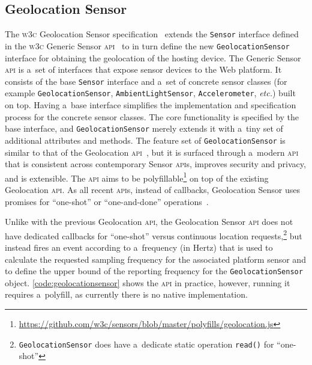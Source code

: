 \documentclass[sigconf,hyphens]{acmart}
\begin{document}
\subsection{Geolocation Sensor}

The \textsc{w3c} Geolocation Sensor specification~\cite{kostiainen2018geolocation}
extends the \texttt{Sensor} interface defined in the
\textsc{w3c} Generic Sensor \textsc{api}~\cite{waldron2018genericsensor}
to in turn define the new \texttt{GeolocationSensor} interface
for obtaining the geolocation of the hosting device.
The Generic Sensor \textsc{api} is a~set of interfaces that expose sensor devices to the Web
platform. It consists of the base \texttt{Sensor} interface and a~set of concrete sensor classes
(for example \texttt{GeolocationSensor}, \texttt{AmbientLightSensor}, \texttt{Accelerometer},
\textit{etc.}) built on top.
Having a~base interface simplifies the implementation and specification process for the concrete
sensor classes. The core functionality is specified by the base interface, and
\texttt{GeolocationSensor} merely extends it with a~tiny set of additional attributes and methods.
The feature set of \texttt{GeolocationSensor} is similar
to that of the Geolocation \textsc{api}~\cite{raskin2010geolocation},
but it is surfaced through a~modern \textsc{api} that is consistent across contemporary Sensor
\textsc{api}s, improves security and privacy, and is extensible.
The \textsc{api} aims to be
polyfillable\footnote{\url{https://github.com/w3c/sensors/blob/master/polyfills/geolocation.js}}
on top of the existing Geolocation \textsc{api}.
As all recent \textsc{api}s, instead of callbacks, Geolocation Sensor
uses promises for ``one-shot'' or ``one-and-done''
operations~\cite{denicola2018tag}.

Unlike with the previous Geolocation \textsc{api}, the Geolocation Sensor \textsc{api}
does not have dedicated callbacks for
``one-shot'' versus continuous location
requests,\footnote{\texttt{GeolocationSensor} does have a~dedicate static operation
\texttt{read()} for ``one-shot''}
but instead fires an event according to a~frequency (in Hertz) that is used
to calculate the requested sampling frequency for the associated platform sensor
and to define the upper bound of the reporting frequency for the \texttt{GeolocationSensor}
object.
\autoref{code:geolocationsensor} shows the \textsc{api} in practice,
however, running it requires a~polyfill, as currently there is no native implementation.
\end{document}
